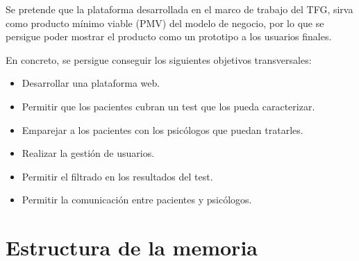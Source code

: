 Se pretende que la plataforma desarrollada en el marco de trabajo del TFG, sirva como producto mínimo viable (PMV) del modelo de negocio, por lo que se persigue poder mostrar el producto como un prototipo a los usuarios finales. 


En concreto, se persigue conseguir los siguientes objetivos transversales:


\begin{itemize}
\item Desarrollar una plataforma web.
\item Permitir que los pacientes cubran un test que los pueda caracterizar.
\item Emparejar a los pacientes con los psicólogos que puedan tratarles.
\item Realizar la gestión de usuarios.
\item Permitir el filtrado en los resultados del test.
\item Permitir la comunicación entre pacientes y psicólogos.
\end{itemize}


\section{Estructura de la memoria}
